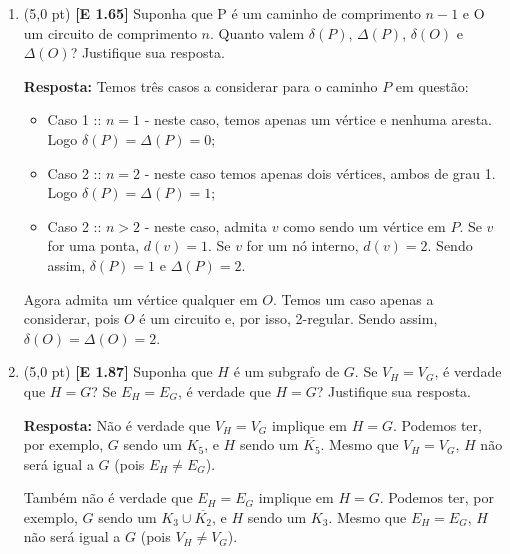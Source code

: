 \documentclass[12pt,a4paper,oneside]{article}
\begin{document}
\begin{enumerate}

	\item (5,0 pt) {\bf [E 1.65]} Suponha que P é um caminho de comprimento $n-1$ e O um circuito de comprimento $n$. Quanto valem $\delta(P)$, $\Delta(P)$, $\delta(O)$ e $\Delta(O)$? Justifique sua resposta.
	
	\vspace{0.2cm}
	
	{\color{blue} {\bf Resposta:} Temos três casos a considerar para o caminho $P$ em questão:		
		\begin{itemize}
			\item Caso 1 :: $n=1$ - neste caso, temos apenas um vértice e nenhuma aresta. Logo $\delta(P) = \Delta(P) = 0$;
			\item Caso 2 :: $n=2$ - neste caso temos apenas dois vértices, ambos de grau 1. Logo $\delta(P) = \Delta(P) = 1$;
			\item Caso 2 :: $n>2$ - neste caso, admita $v$ como sendo um vértice em $P$. Se $v$ for uma ponta, $d(v)=1$. Se $v$ for um nó interno, $d(v)=2$. Sendo assim, $\delta(P) =1$ e $\Delta(P) = 2$.
		\end{itemize}
		Agora admita um vértice qualquer em $O$. Temos um caso apenas a considerar, pois $O$ é um circuito e, por isso, 2-regular. Sendo assim, $\delta(O) = \Delta(O) = 2$.
	}
	
	\item (5,0 pt) {\bf [E 1.87]}  Suponha que $H$ é um subgrafo de $G$. Se $V_H = V_G$, é verdade que $H = G$? Se $E_H = E_G$, é verdade que $H = G$? Justifique sua resposta.
	
	\vspace{0.2cm}
	
	{\color{blue} {\bf Resposta:} Não é verdade que $V_H = V_G$ implique em $H=G$. Podemos ter, por exemplo, $G$ sendo um $K_5$, e $H$ sendo um $\overline{K_5}$. Mesmo que $V_H = V_G$, $H$ não será igual a $G$ (pois $E_H \not= E_G$).
		
	Também não é verdade que $E_H = E_G$ implique em $H=G$. Podemos ter, por exemplo, $G$ sendo um $K_3 \cup \overline{K_2}$, e $H$ sendo um $K_3$. Mesmo que $E_H = E_G$, $H$ não será igual a $G$ (pois $V_H \not= V_G$).
	}
	
	\end{enumerate}
\end{document}
